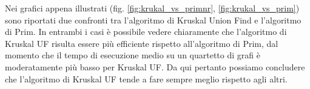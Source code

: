 Nei grafici appena illustrati (fig. \ref{fig:krukal_vs_primnr}, \ref{fig:krukal_vs_prim}) sono riportati due confronti tra l'algoritmo di Kruskal Union Find e l'algoritmo di Prim. In entrambi i casi è possibile vedere chiaramente che l'algoritmo di Kruskal UF risulta essere più efficiente rispetto all'algoritmo di Prim, dal momento che il tempo di esecuzione medio su un quartetto di grafi è moderatamente più basso per Kruskal UF. Da qui pertanto possiamo concludere che l'algoritmo di Kruskal UF tende a fare sempre meglio rispetto agli altri.
